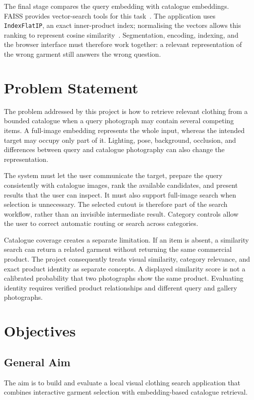 The final stage compares the query embedding with catalogue embeddings. FAISS
provides vector-search tools for this task~\cite{Johnson2017FAISS}. The application
uses \texttt{IndexFlatIP}, an exact inner-product index; normalising the vectors
allows this ranking to represent cosine similarity~\cite{FaissIndexes}.
Segmentation, encoding, indexing, and the browser interface must therefore work
together: a relevant representation of the wrong garment still answers the
wrong question.

\section{Problem Statement}
\label{sec:problem-statement}

The problem addressed by this project is how to retrieve relevant clothing from
a bounded catalogue when a query photograph may contain several competing items.
A full-image embedding represents the whole input, whereas the intended target
may occupy only part of it. Lighting, pose, background, occlusion, and differences
between query and catalogue photography can also change the representation.

The system must let the user communicate the target, prepare the query
consistently with catalogue images, rank the available candidates, and present
results that the user can inspect. It must also support full-image search when
selection is unnecessary. The selected cutout is therefore part of the search
workflow, rather than an invisible intermediate result. Category controls allow
the user to correct automatic routing or search across categories.

Catalogue coverage creates a separate limitation. If an item is absent, a
similarity search can return a related garment without returning the same
commercial product. The project consequently treats visual similarity,
category relevance, and exact product identity as separate concepts. A displayed
similarity score is not a calibrated probability that two photographs show the
same product. Evaluating identity requires verified product relationships and
different query and gallery photographs.

\section{Objectives}
\label{sec:objectives}

\subsection{General Aim}
The aim is to build and evaluate a local visual clothing search application that
combines interactive garment selection with embedding-based catalogue retrieval.

